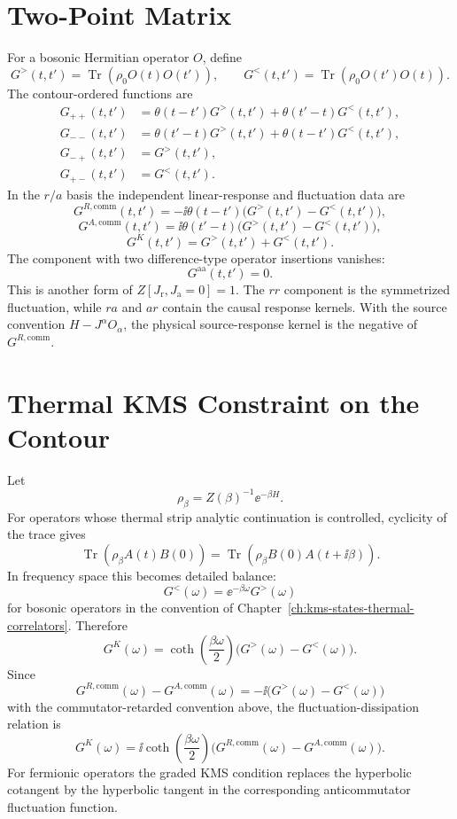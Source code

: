 \section{Two-Point Matrix}

For a bosonic Hermitian operator \(O\), define
\[
  G^>(t,t')=\operatorname{Tr}(\rho_0O(t)O(t')),
  \qquad
  G^<(t,t')=\operatorname{Tr}(\rho_0O(t')O(t)).
\]
The contour-ordered functions are
\begin{align}
  G_{++}(t,t')
  &=
  \theta(t-t')G^>(t,t')+\theta(t'-t)G^<(t,t'),\\
  G_{--}(t,t')
  &=
  \theta(t'-t)G^>(t,t')+\theta(t-t')G^<(t,t'),\\
  G_{-+}(t,t')&=G^>(t,t'),\\
  G_{+-}(t,t')&=G^<(t,t').
\end{align}
In the \(r/a\) basis the independent linear-response and fluctuation data are
\[
  G^{R,\mathrm{comm}}(t,t')=
  -\ii\theta(t-t')\bigl(G^>(t,t')-G^<(t,t')\bigr),
\]
\[
  G^{A,\mathrm{comm}}(t,t')=
  \ii\theta(t'-t)\bigl(G^>(t,t')-G^<(t,t')\bigr),
\]
\[
  G^K(t,t')=G^>(t,t')+G^<(t,t').
\]
The component with two difference-type operator insertions vanishes:
\[
  G^{\mathrm{aa}}(t,t')=0 .
\]
This is another form of
\(Z[J_{\mathrm r},J_{\mathrm a}=0]=1\).  The \(rr\) component is the
symmetrized fluctuation, while \(ra\) and \(ar\) contain the causal response
kernels.  With the source convention \(H-J^\alpha O_\alpha\), the physical
source-response kernel is the negative of \(G^{R,\mathrm{comm}}\).

\section{Thermal KMS Constraint on the Contour}

Let
\[
  \rho_\beta=Z(\beta)^{-1}\ee^{-\beta H}.
\]
For operators whose thermal strip analytic continuation is controlled,
cyclicity of the trace gives
\[
  \operatorname{Tr}(\rho_\beta A(t)B(0))
  =
  \operatorname{Tr}(\rho_\beta B(0)A(t+\ii\beta)).
\]
In frequency space this becomes detailed balance:
\[
  G^<(\omega)=\ee^{-\beta\omega}G^>(\omega)
\]
for bosonic operators in the convention of
Chapter~\ref{ch:kms-states-thermal-correlators}.  Therefore
\[
  G^K(\omega)
  =
  \coth\!\left(\frac{\beta\omega}{2}\right)
  \bigl(G^>(\omega)-G^<(\omega)\bigr).
\]
Since
\[
  G^{R,\mathrm{comm}}(\omega)-G^{A,\mathrm{comm}}(\omega)
  =
  -\ii\bigl(G^>(\omega)-G^<(\omega)\bigr)
\]
with the commutator-retarded convention above, the fluctuation-dissipation
relation is
\[
  G^K(\omega)
  =
  \ii\coth\!\left(\frac{\beta\omega}{2}\right)
  \bigl(G^{R,\mathrm{comm}}(\omega)
  -G^{A,\mathrm{comm}}(\omega)\bigr).
\]
For fermionic operators the graded KMS condition replaces the hyperbolic
cotangent by the hyperbolic tangent in the corresponding anticommutator
fluctuation function.

